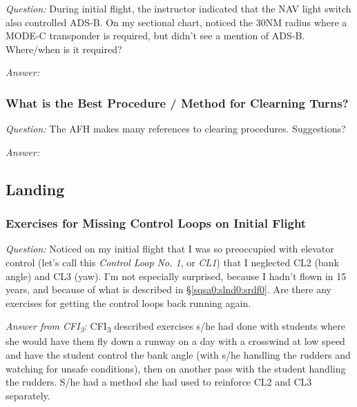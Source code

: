 \documentclass[letterpaper,10pt,titlepage]{article}
\begin{document}
\emph{Question:} During initial flight, the instructor indicated that the NAV
light switch also controlled ADS-B.  On my sectional chart, noticed the 30NM
radius where a MODE-C transponder is required, but didn't see a mention of ADS-B.
Where/when is it required?

\noindent{}\emph{Answer:}



\subsubsection{What is the Best Procedure / Method for Clearning Turns?}
\label{sqsa0:sfig0:sclt0}

\emph{Question:} The AFH makes many references to clearing procedures.  Suggestions?

\noindent{}\emph{Answer:}


\subsection{Landing}
\label{sqsa0:slnd0}


\subsubsection{Exercises for Missing Control Loops on Initial Flight}
\label{sqsa0:slnd0:slhy0}

\emph{Question:} Noticed on my initial flight that I was so preoccupied with
elevator control (let's call this \emph{Control Loop No. 1}, or \emph{CL1})
that I neglected CL2 (bank angle) and CL3 (yaw).  I'm not especially surprised,
because I hadn't flown in 15 years, and because of what is described in
\S{}\ref{sqsa0:slnd0:srdf0}.  Are there any exercises for getting the control loops
back running again.

\noindent{}\emph{Answer from CFI\textsubscript{3}:}
CFI\textsubscript{3} described exercises s/he had done with students where she
would have them fly down a runway on a day with a crosswind at low speed and
have the student control the bank angle (with s/he
handling the rudders and watching for unsafe conditions), then on another
pass with the student handling the rudders.  S/he had a method she had used
to reinforce CL2 and CL3 separately.
\end{document}
